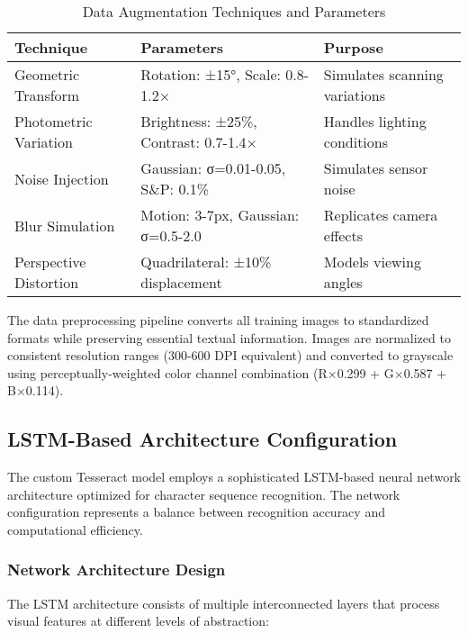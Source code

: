 \begin{table}[H]
\centering
\small
\caption{Data Augmentation Techniques and Parameters}
\label{tab:augmentation_techniques}
\begin{tabular}{lll}
\toprule
\textbf{Technique} & \textbf{Parameters} & \textbf{Purpose} \\
\midrule
Geometric Transform & Rotation: ±15°, Scale: 0.8-1.2× & Simulates scanning variations \\
Photometric Variation & Brightness: ±25\%, Contrast: 0.7-1.4× & Handles lighting conditions \\
Noise Injection & Gaussian: σ=0.01-0.05, S\&P: 0.1\% & Simulates sensor noise \\
Blur Simulation & Motion: 3-7px, Gaussian: σ=0.5-2.0 & Replicates camera effects \\
Perspective Distortion & Quadrilateral: ±10\% displacement & Models viewing angles \\
\bottomrule
\end{tabular}
\end{table}

The data preprocessing pipeline converts all training images to standardized formats while preserving essential textual information. Images are normalized to consistent resolution ranges (300-600 DPI equivalent) and converted to grayscale using perceptually-weighted color channel combination (R×0.299 + G×0.587 + B×0.114).

\subsection{LSTM-Based Architecture Configuration}

The custom Tesseract model employs a sophisticated LSTM-based neural network architecture optimized for character sequence recognition. The network configuration represents a balance between recognition accuracy and computational efficiency.

\subsubsection{Network Architecture Design}

The LSTM architecture consists of multiple interconnected layers that process visual features at different levels of abstraction:

